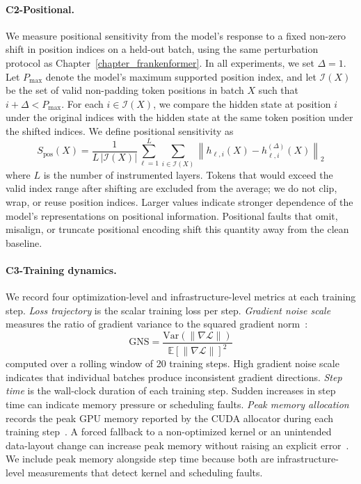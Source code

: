 \paragraph{C2-Positional.} We measure positional sensitivity from the model's response to a fixed non-zero shift in position indices on a held-out batch, using the same perturbation protocol as Chapter~\ref{chapter_frankenformer}. In all experiments, we set $\Delta = 1$. Let $P_{\max}$ denote the model's maximum supported position index, and let $\mathcal{I}(X)$ be the set of valid non-padding token positions in batch $X$ such that $i+\Delta < P_{\max}$. For each $i \in \mathcal{I}(X)$, we compare the hidden state at position $i$ under the original indices with the hidden state at the same token position under the shifted indices. We define positional sensitivity as
\begin{equation}
S_{\text{pos}}(X) =
\frac{1}{L\,|\mathcal{I}(X)|}
\sum_{\ell=1}^{L}
\sum_{i \in \mathcal{I}(X)}
\left\|
h_{\ell,i}(X) - h_{\ell,i}^{(\Delta)}(X)
\right\|_2
\label{eq:positional_sensitivity}
\end{equation}
where $L$ is the number of instrumented layers. Tokens that would exceed the valid index range after shifting are excluded from the average; we do not clip, wrap, or reuse position indices. Larger values indicate stronger dependence of the model's representations on positional information. Positional faults that omit, misalign, or truncate positional encoding shift this quantity away from the clean baseline.

\paragraph{C3-Training dynamics.} We record four optimization-level and infrastructure-level metrics at each training step. \emph{Loss trajectory} is the scalar training loss per step. \emph{Gradient noise scale} measures the ratio of gradient variance to the squared gradient norm~\cite{mccandlish2018empirical}:
\begin{equation}
\text{GNS} = \frac{\text{Var}(\|\nabla \mathcal{L}\|)}{\mathbb{E}[\|\nabla \mathcal{L}\|]^2}
\label{eq:gns}
\end{equation}
computed over a rolling window of 20 training steps. High gradient noise scale indicates that individual batches produce inconsistent gradient directions. \emph{Step time} is the wall-clock duration of each training step. Sudden increases in step time can indicate memory pressure or scheduling faults. \emph{Peak memory allocation} records the peak GPU memory reported by the CUDA allocator during each training step~\cite{nvidia2021dlprof,chakrabarti2012cuda}. A forced fallback to a non-optimized kernel or an unintended data-layout change can increase peak memory without raising an explicit error~\cite{dao2022flashattention}. We include peak memory alongside step time because both are infrastructure-level measurements that detect kernel and scheduling faults.


